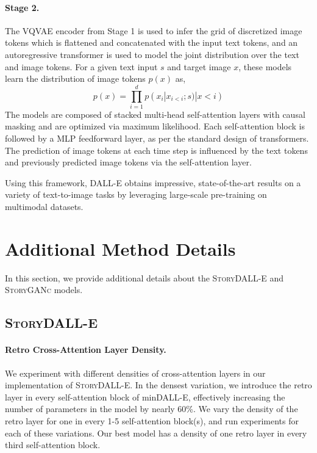 \documentclass[runningheads]{llncs}
\newcommand{\sdalle}[1]{\textsc{StoryDALL-E}}
\newcommand{\sgan}[1]{\textsc{StoryGANc}}
\begin{document}
\paragraph{Stage 2.} The VQVAE encoder from Stage 1 is used to infer the grid of discretized image tokens which is flattened and concatenated with the input text tokens, and an autoregressive transformer is used to model the joint distribution over the text and image tokens. For a given text input $s$ and target image $x$, these models learn the distribution of image tokens $p(x)$ as,
\begin{equation}
    p(x) = \prod_{i=1}^{d} p(x_{i}|x_{i<i};s)
|x<i)
\end{equation}
The models are composed of stacked multi-head self-attention layers with causal masking and are optimized via maximum likelihood. Each self-attention block is followed by a MLP feedforward layer, as per the standard design of transformers. The prediction of image tokens at each time step is influenced by the text tokens and previously predicted image tokens via the self-attention layer.

Using this framework, DALL-E obtains impressive, state-of-the-art results on a variety of text-to-image tasks by leveraging large-scale pre-training on multimodal datasets.


\section{Additional Method Details} \label{sec:modeling_appendix}
In this section, we provide additional details about the \sdalle{} and \sgan{} models.

\subsection{\sdalle{}}

\paragraph{Retro Cross-Attention Layer Density.} We experiment with different densities of cross-attention layers in our implementation of \sdalle{}. In the densest variation, we introduce the retro layer in every self-attention block of minDALL-E, effectively increasing the number of parameters in the model by nearly 60\%. We vary the density of the retro layer for one in every 1-5 self-attention block(s), and run experiments for each of these variations. Our best model has a density of one retro layer in every third self-attention block.
\end{document}
